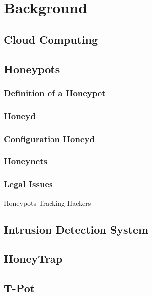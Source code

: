 \chapter{Background}

\section{Cloud Computing}

\section{Honeypots}

\subsection{Definition of a Honeypot}

\subsection{Honeyd}

\subsection{Configuration Honeyd}

\subsection{Honeynets}

\subsection{Legal Issues}

Honeypots Tracking Hackers

\section{Intrusion Detection System}


\section{HoneyTrap}

\section{T-Pot}